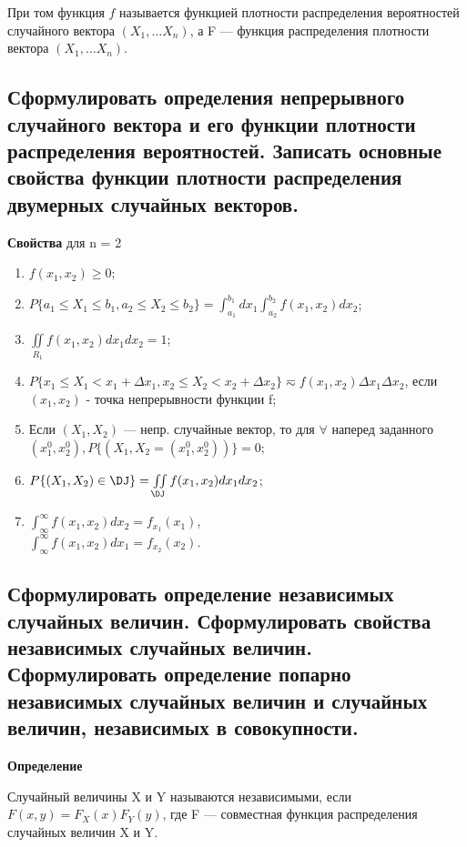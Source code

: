 При том функция $f$ называется функцией плотности распределения вероятностей случайного вектора $(X_1, \dots X_n)$, а F --- функция распределения плотности вектора $(X_1, \dots X_n)$.

\subsection{Сформулировать определения непрерывного случайного вектора и его функции плотности распределения вероятностей. Записать основные свойства функции плотности распределения двумерных случайных векторов.}

\textbf{Свойства} для n = 2

\begin{enumerate}[label=\arabic*.]
	\item $f(x_1, x_2) \geq 0$;
	\item $P\{a_1 \leq X_1 \leq b_1, a_2 \leq X_2 \leq b_2\} = \int_{a_1}^{b_1}dx_1\int_{a_2}^{b_2}f(x_1, x_2)dx_2$;
	\item $\iint\limits_{R_1} f(x_1, x_2)dx_1dx_2 = 1$;
	\item $P\{x_1 \leq X_1 < x_1 + \Delta x_1, x_2 \leq X_2 < x_2 + \Delta x_2\} \eqsim f(x_1, x_2) \Delta x_1 \Delta x_2$, если $(x_1, x_2)$ - точка непрерывности функции f;
	\item Если $(X_1, X_2)$ --- непр. случайные вектор, то для $\forall$ наперед заданного $(x_1^0, x_2^0), P\{(X_1, X_2 = (x_1^0, x_2^0))\} = 0$;
	\item $P\{(X_1, X_2) \in \DJ\} = \iint\limits_{\DJ}f(x_1, x_2)dx_1dx_2$;
	\item $\int_{\infty}^{\infty}f(x_1, x_2)dx_2 = f_{x_1}(x_1)$, \\  $\int_{\infty}^{\infty}f(x_1, x_2)dx_1 = f_{x_2}(x_2)$.
\end{enumerate}

\subsection{Сформулировать определение независимых случайных величин. Сформулировать свойства независимых случайных величин. Сформулировать определение попарно независимых случайных величин и случайных величин, независимых в совокупности.}

\textbf{Определение}

Случайный величины X и Y называются независимыми, если $F(x, y) = F_X(x)F_Y(y)$, где F --- совместная функция распределения случайных величин X и Y.

